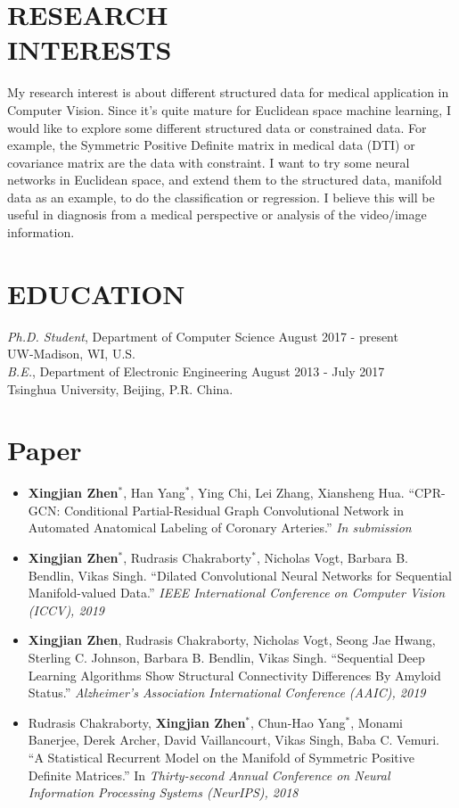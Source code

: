 \documentclass[margin]{res}
\begin{document}
\begin{resume}
\section{RESEARCH \\ INTERESTS}
                My research interest is about different structured data for medical application in Computer Vision. Since it’s quite mature for Euclidean space machine learning, I would like to explore some different structured data or constrained data. For example, the Symmetric Positive Definite matrix in medical data (DTI) or covariance matrix are the data with constraint. I want to try some neural networks in Euclidean space, and extend them to the structured data, manifold data as an example, to do the classification or regression. I believe this will be useful in diagnosis from a medical perspective or analysis of the video/image information.
\section{EDUCATION} 
                {\sl {Ph.D. Student}}, Department of Computer Science \hfill August 2017 - present\\
                UW-Madison, WI, U.S. \\
                {\sl {B.E.}}, Department of Electronic Engineering \hfill August 2013 - July 2017\\
                Tsinghua University, Beijing, P.R. China. 

\section{Paper}
                \begin{itemize}\itemsep -2.2pt
                \item \textbf{Xingjian Zhen$^*$}, Han Yang$^*$, Ying Chi, Lei Zhang, Xiansheng Hua. ``CPR-GCN: Conditional Partial-Residual Graph Convolutional Network in Automated Anatomical Labeling of Coronary Arteries.'' \emph{In submission} 
                \item \textbf{Xingjian Zhen$^*$}, Rudrasis Chakraborty$^*$, Nicholas Vogt, Barbara B. Bendlin, Vikas Singh. ``Dilated Convolutional Neural Networks for Sequential Manifold-valued Data.'' \emph{IEEE International Conference on Computer Vision (ICCV), 2019}
                \item \textbf{Xingjian Zhen}, Rudrasis Chakraborty, Nicholas Vogt, Seong Jae Hwang, Sterling C. Johnson, Barbara B. Bendlin, Vikas Singh. ``Sequential Deep Learning Algorithms Show Structural Connectivity Differences By Amyloid Status.'' \emph{Alzheimer's Association International Conference (AAIC), 2019}
                \item Rudrasis Chakraborty, \textbf{Xingjian Zhen$^*$}, Chun-Hao Yang$^*$, Monami Banerjee, Derek Archer, David Vaillancourt, Vikas Singh, Baba C. Vemuri. ``A Statistical Recurrent Model on the Manifold of Symmetric Positive Definite Matrices.''  In \emph{Thirty-second Annual Conference on Neural Information Processing Systems (NeurIPS), 2018}
                \end{itemize}


\end{resume}
\end{document}
